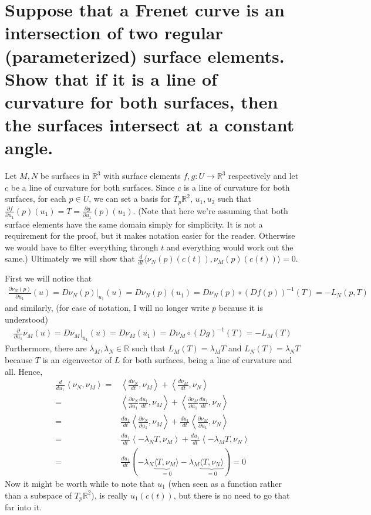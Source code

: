 \documentclass[12pt]{amsart}
\begin{document}
\newpage
\section{Suppose that a Frenet curve is an intersection of two regular (parameterized) surface elements. Show that if it is a line of curvature for both surfaces, then the surfaces intersect at a constant angle.}
\begin{comment}
	page 277
\end{comment}
Let $M,N$ be surfaces in $\mathbb{R}^3$ with surface elements $f,g:U\to\mathbb{R}^3$ respectively and let $c$ be a line of curvature for both surfaces. Since $c$ is a line of curvature for both surfaces, for each $p\in U$, we can set a basis for $T_p\mathbb{R}^2$, $u_1,u_2$ such that $\frac{\partial f}{\partial u_1}(p)(u_1)=T=\frac{\partial g}{\partial u_1}(p)(u_1)$. (Note that here we're assuming that both surface elements have the same domain simply for simplicity. It is not a requirement for the proof, but it makes notation easier for the reader. Otherwise we would have to filter everything through $t$ and everything would work out the same.) Ultimately we will show that $\frac{d}{dt}\langle \nu_N(p)(c(t)),\nu_M(p)(c(t))\rangle=0$.

First we will notice that 
\begin{align*}
	\frac{\partial\nu_N(p)}{\partial u_1}(u)=D\nu_N(p)\big|_{u_1}(u)=D\nu_N(p)(u_1)=D\nu_N(p)\circ\left(Df(p)\right)^{-1}(T)=-L_N(p,T)
\end{align*} and similarly, (for ease of notation, I will no longer write $p$ because it is understood)
\begin{align*}
	\frac{\partial}{\partial u_1}\nu_M(u)=D\nu_M\big|_{u_1}(u)=D\nu_M(u_1)=D\nu_M\circ\left(Dg\right)^{-1}(T)=-L_M(T)
\end{align*}
Furthermore, there are $\lambda_M,\lambda_N\in\mathbb{R}$ such that $L_M(T)=\lambda_MT$ and $L_N(T)=\lambda_NT$ because $T$ is an eigenvector of $L$ for both surfaces, being a line of curvature and all. Hence,
\begin{align*}
	\frac{d}{du_1}\left\langle\nu_N,\nu_M\right\rangle=&\left\langle\frac{d\nu_N}{dt},\nu_M\right\rangle+\left\langle\frac{d\nu_M}{dt},\nu_N\right\rangle
	\\=&\left\langle\frac{\partial\nu_N}{\partial u_1}\frac{du_1}{dt},\nu_M\right\rangle+\left\langle\frac{\partial\nu_M}{\partial u_1}\frac{du_1}{dt},\nu_N\right\rangle
	\\=&\frac{du_1}{dt}\left\langle\frac{\partial\nu_N}{\partial u_1},\nu_M\right\rangle+\frac{du_1}{dt}\left\langle\frac{\partial\nu_M}{\partial u_1},\nu_N\right\rangle
	\\=&\frac{du_1}{dt}\left\langle-\lambda_NT,\nu_M\right\rangle+\frac{du_1}{dt}\left\langle-\lambda_MT,\nu_N\right\rangle
	\\=&\frac{du_1}{dt}\left(-\lambda_N\underbrace{\langle T,\nu_M\rangle}_{=0}-\lambda_M\underbrace{\langle T,\nu_N\rangle}_{=0}\right)=0
\end{align*} Now it might be worth while to note that $u_1$ (when seen as a function rather than a subspace of $T_p\mathbb{R}^2$), is really $u_1(c(t))$, but there is no need to go that far into it.
\end{document}
